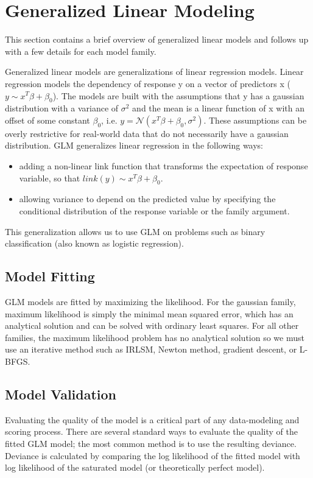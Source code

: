 \documentclass[11pt]{article}
\begin{document}

\section{Generalized Linear Modeling} 
This section contains a brief overview of generalized linear models and follows up with a few details for each model family.

Generalized linear models are generalizations of linear regression models. Linear regression models the dependency of response y on a vector of predictors x ($y \sim x^T \beta + \beta_0$). The models are built with the assumptions that y has a gaussian distribution with a variance of $\sigma^2$ and the mean is a linear function of x with an offset of some constant $\beta_0$, i.e. $ y = \mathcal{N}(x^T \beta + \beta_0 ,  \sigma^2) $. These assumptions can be overly restrictive for real-world data that do not necessarily have a gaussian distribution. GLM generalizes linear regression in the following ways: 
\begin{itemize} 
\item adding a non-linear link function that transforms the expectation of response variable, so that $link(y) \sim x^T \beta + \beta_0$.
\item allowing variance to depend on the predicted value by specifying the conditional distribution of the response variable or the family argument.

\end{itemize}
This generalization allows us to use GLM on problems such as binary classification (also known as logistic regression).

\subsection{Model Fitting}
GLM models are fitted by maximizing the likelihood. For the gaussian family, maximum likelihood is simply the minimal mean squared error, which has an analytical solution and can be solved with ordinary least squares. For all other families, the maximum likelihood problem has no analytical solution so we must use an iterative method such as IRLSM, Newton method, gradient descent, or L-BFGS.

\subsection{Model Validation}
Evaluating the quality of the model is a critical part of any data-modeling and scoring process. There are several standard ways to evaluate the quality of the fitted GLM model; the most common method is to use the resulting deviance. Deviance is calculated by comparing the log likelihood of the fitted model with log likelihood of the saturated model (or theoretically perfect model).
\end{document}
